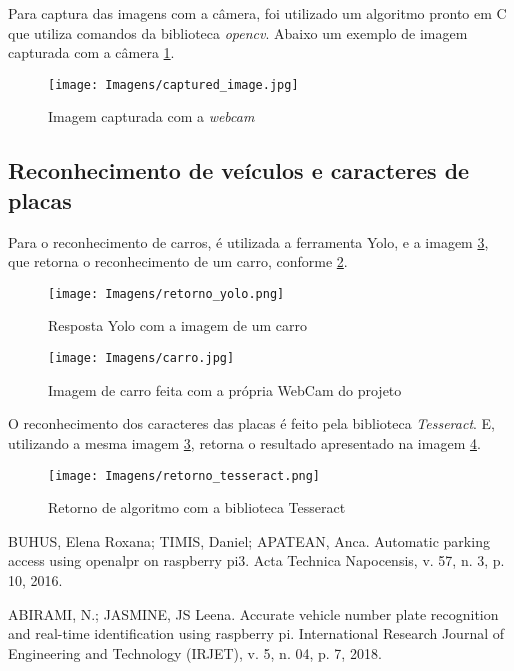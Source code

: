 \documentclass[conference]{IEEEtran}
\begin{document}
\begin{itemize}
Para captura das imagens com a câmera, foi utilizado um algoritmo pronto em C que utiliza comandos da biblioteca \textit{opencv}. Abaixo um exemplo de imagem capturada com a câmera \ref{fig:cam}. 

\begin{figure}[h]
    \centering
    \texttt{[image: Imagens/captured\_image.jpg]}
    \caption{Imagem capturada com a \textit{webcam}}
    \label{fig:cam}
\end{figure}

\subsection{Reconhecimento de veículos e caracteres de placas}

Para o reconhecimento de carros, é utilizada a ferramenta Yolo, e a imagem \ref{fig:carro}, que retorna o reconhecimento de um carro, conforme \ref{fig:respYolo}.

\begin{figure}[h]
    \centering
    \texttt{[image: Imagens/retorno\_yolo.png]}
    \caption{Resposta Yolo com a imagem de um carro}
    \label{fig:respYolo}
\end{figure}

\begin{figure}[h]
    \centering
    \texttt{[image: Imagens/carro.jpg]}
    \caption{Imagem de carro feita com a própria WebCam do projeto}
    \label{fig:carro}
\end{figure}

O reconhecimento dos caracteres das placas é feito pela biblioteca \textit{Tesseract}. E, utilizando a mesma imagem \ref{fig:carro}, retorna o resultado apresentado na imagem \ref{fig:respTesseract}.

\begin{figure}
    \centering
    \texttt{[image: Imagens/retorno\_tesseract.png]}
    \caption{Retorno de algoritmo com a biblioteca Tesseract}
    \label{fig:respTesseract}
\end{figure}
\newpage
\begin{thebibliography}{00}
 BUHUS, Elena Roxana; TIMIS, Daniel; APATEAN, Anca. Automatic parking access using openalpr on raspberry pi3. Acta Technica Napocensis, v. 57, n. 3, p. 10, 2016.

 ABIRAMI, N.; JASMINE, JS Leena. Accurate vehicle number plate recognition and real-time identification using raspberry pi. International Research Journal of Engineering and Technology (IRJET), v. 5, n. 04, p. 7, 2018.


\end{thebibliography}
\end{itemize}
\end{document}
